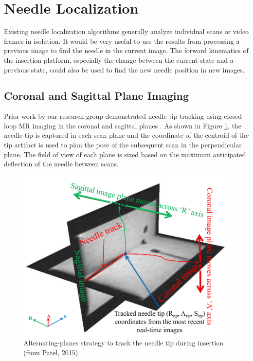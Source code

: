 \section{Needle Localization}
Existing needle localization algorithms generally analyze individual scans or video frames in isolation. It would be very useful to use the results from processing a previous image to find the needle in the current image. The forward kinematics of the insertion platform, especially the change between the current state and a previous state, could also be used to find the new needle position in new images.

\subsection{Coronal and Sagittal Plane Imaging}
Prior work by our research group demonstrated needle tip tracking using closed-loop MR imaging in the coronal and sagittal planes \cite{patel_closed-loop_2015}. As shown in Figure \ref{fig:patel_mri_tracking}, the needle tip is captured in each scan plane and the coordinate of the centroid of the tip artifact is used to plan the pose of the subsequent scan in the perpendicular plane. The field of view of each plane is sized based on the maximum anticipated deflection of the needle between scans.

\begin{figure}[h]
\includegraphics[width=1.0\textwidth]{Fig/chap2/patel_mri_tracking.png}
\caption{Alternating-planes strategy to track the needle tip during insertion (from Patel, 2015).}
\label{fig:patel_mri_tracking}
\end{figure}

